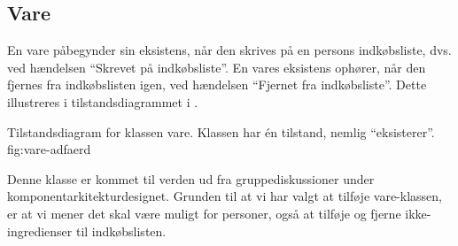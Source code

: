 \subsection{Vare}
En vare påbegynder sin eksistens, når den skrives på en persons indkøbsliste, dvs. ved hændelsen ``Skrevet på indkøbsliste''. En vares eksistens ophører, når den fjernes fra indkøbslisten igen, ved hændelsen ``Fjernet fra indkøbsliste''. Dette illustreres i tilstandsdiagrammet i .

  {Tilstandsdiagram for klassen vare. Klassen har én tilstand, nemlig ``eksisterer''.}
  {fig:vare-adfaerd}
  
Denne klasse er kommet til verden ud fra gruppediskussioner under komponentarkitekturdesignet. Grunden til at vi har valgt at tilføje vare-klassen, er at vi mener det skal være muligt for personer, også at tilføje og fjerne ikke-ingredienser til indkøbslisten.  
